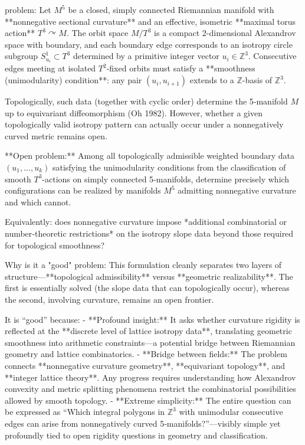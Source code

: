 problem:  
Let \( M^5 \) be a closed, simply connected Riemannian manifold with **nonnegative sectional curvature** and an effective, isometric **maximal torus action** \(T^3 \curvearrowright M\).  The orbit space \(M/T^3\) is a compact 2-dimensional Alexandrov space with boundary, and each boundary edge corresponds to an isotropy circle subgroup \(S^1_{u_i} \subset T^3\) determined by a primitive integer vector \(u_i \in \mathbb{Z}^3\).  Consecutive edges meeting at isolated  \(T^2\)-fixed orbits must satisfy a **smoothness (unimodularity) condition**: any pair \((u_i, u_{i+1})\) extends to a \(\mathbb{Z}\)-basis of \(\mathbb{Z}^3\).  

Topologically, such data (together with cyclic order) determine the 5‑manifold \(M\) up to equivariant diffeomorphism (Oh 1982).  However, whether a given topologically valid isotropy pattern can actually occur under a nonnegatively curved metric remains open.

**Open problem:**  
Among all topologically admissible weighted boundary data \((u_1,\dots,u_k)\) satisfying the unimodularity conditions from the classification of smooth \(T^3\)-actions on simply connected 5‑manifolds, determine precisely which configurations can be realized by manifolds \(M^5\) admitting nonnegative curvature and which cannot.  

Equivalently: does nonnegative curvature impose *additional combinatorial or number‑theoretic restrictions* on the isotropy slope data beyond those required for topological smoothness?  

Why is it a "good" problem:  
This formulation cleanly separates two layers of structure—**topological admissibility** versus **geometric realizability**.  The first is essentially solved (the slope data that can topologically occur), whereas the second, involving curvature, remains an open frontier.  

It is “good” because:  
- **Profound insight:** It asks whether curvature rigidity is reflected at the **discrete level of lattice isotropy data**, translating geometric smoothness into arithmetic constraints—a potential bridge between Riemannian geometry and lattice combinatorics.  
- **Bridge between fields:** The problem connects **nonnegative curvature geometry**, **equivariant topology**, and **integer lattice theory**. Any progress requires understanding how Alexandrov convexity and metric splitting phenomena restrict the combinatorial possibilities allowed by smooth topology.  
- **Extreme simplicity:** The entire question can be expressed as “Which integral polygons in \(\mathbb{Z}^3\) with unimodular consecutive edges can arise from nonnegatively curved 5‑manifolds?”—visibly simple yet profoundly tied to open rigidity questions in geometry and classification.